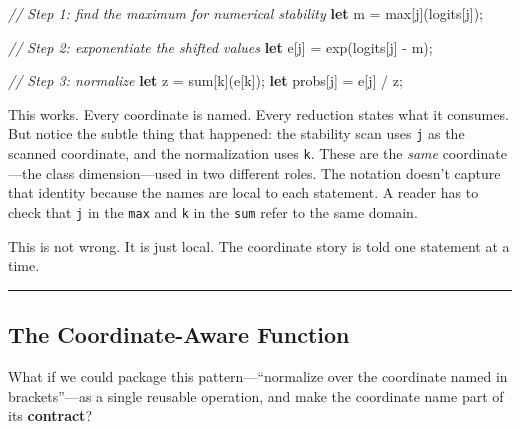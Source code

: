 \documentclass[11pt,]{article}
\newenvironment{Shaded}{}{}
\newcommand{\CommentTok}[1]{\textcolor[rgb]{0.38,0.63,0.69}{\textit{#1}}}
\newcommand{\KeywordTok}[1]{\textcolor[rgb]{0.00,0.44,0.13}{\textbf{#1}}}
\newcommand{\NormalTok}[1]{#1}
\newcommand{\OperatorTok}[1]{\textcolor[rgb]{0.40,0.40,0.40}{#1}}
\begin{document}
\begin{Shaded}
\begin{Highlighting}[]
\CommentTok{// Step 1: find the maximum for numerical stability}
\KeywordTok{let}\NormalTok{ m = max}\OperatorTok{[}\NormalTok{j}\OperatorTok{]}\NormalTok{(logits}\OperatorTok{[}\NormalTok{j}\OperatorTok{]}\NormalTok{);}

\CommentTok{// Step 2: exponentiate the shifted values}
\KeywordTok{let}\NormalTok{ e}\OperatorTok{[}\NormalTok{j}\OperatorTok{]}\NormalTok{ = exp(logits}\OperatorTok{[}\NormalTok{j}\OperatorTok{]}\NormalTok{ - m);}

\CommentTok{// Step 3: normalize}
\KeywordTok{let}\NormalTok{ z = sum}\OperatorTok{[}\NormalTok{k}\OperatorTok{]}\NormalTok{(e}\OperatorTok{[}\NormalTok{k}\OperatorTok{]}\NormalTok{);}
\KeywordTok{let}\NormalTok{ probs}\OperatorTok{[}\NormalTok{j}\OperatorTok{]}\NormalTok{ = e}\OperatorTok{[}\NormalTok{j}\OperatorTok{]}\NormalTok{ / z;}
\end{Highlighting}
\end{Shaded}

This works. Every coordinate is named. Every reduction states what it
consumes. But notice the subtle thing that happened: the stability scan
uses \texttt{j} as the scanned coordinate, and the normalization uses
\texttt{k}. These are the \emph{same} coordinate---the class
dimension---used in two different roles. The notation doesn't capture
that identity because the names are local to each statement. A reader
has to check that \texttt{j} in the \texttt{max} and \texttt{k} in the
\texttt{sum} refer to the same domain.

This is not wrong. It is just local. The coordinate story is told one
statement at a time.

\begin{center}\rule{0.5\linewidth}{0.4pt}\end{center}

\hypertarget{the-coordinate-aware-function}{%
\subsection{The Coordinate-Aware
Function}\label{the-coordinate-aware-function}}

What if we could package this pattern---``normalize over the coordinate
named in brackets''---as a single reusable operation, and make the
coordinate name part of its \textbf{contract}?
\end{document}
